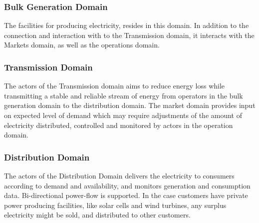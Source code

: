     \subsubsection{Bulk Generation Domain} The facilities for producing electricity, resides in this domain. In addition to the connection and interaction with  to the Transmission domain, it interacts with the Markets domain, as well as the operations domain.  
    \subsubsection{Transmission Domain} The actors of the Transmission domain aims to reduce energy loss while transmitting a stable and reliable stream of energy from operators in the bulk generation domain to the distribution domain. The market domain provides input on expected level of demand which may require adjustments of the amount of electricity distributed, controlled and monitored by actors in the operation domain.  
    \subsubsection{Distribution Domain} The actors of the Distribution Domain delivers the electricity to consumers according to demand and availability, and monitors generation and consumption data. Bi-directional power-flow is supported. In the case customers have private  power producing facilities, like solar cells and wind turbines, any surplus electricity might be sold, and distributed to other customers.
